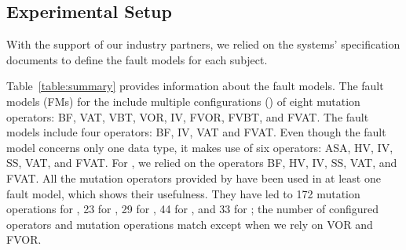 

\subsection{Experimental Setup}


With the support of our industry partners, we relied on
 the systems' specification documents
 to define the fault models for each subject.








{Table~\ref{table:summary} provides information about the fault models.}
The fault models (FMs) for the \ADCS include multiple configurations () of eight mutation operators: BF, VAT, VBT, VOR, IV, FVOR, FVBT, and FVAT.
The \PDHU fault models include four operators: BF, IV, VAT and FVAT.
Even though the \GPS fault model concerns only one data type, it makes use of six operators: ASA, HV, IV, SS, VAT, and FVAT.
For \PARAM, we relied on the operators BF, HV, IV, SS, VAT, and FVAT.
All the mutation operators provided by \APPR have been used in at least one fault model, which shows their usefulness.
{They have led to 172 mutation operations for \ADCS, 23 for \GPS, 29 for \PDHU, 44 for \PARAM, and 33 for \GCSP; the number of configured operators and mutation operations match except when we rely on VOR and FVOR.}


